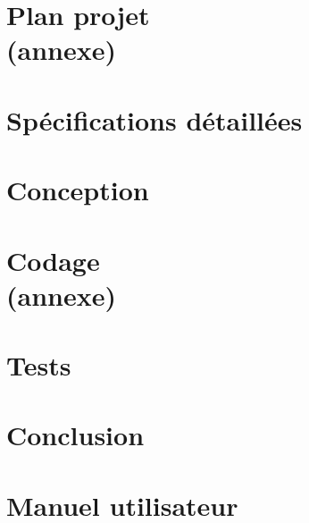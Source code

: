 \documentclass[12pt,a4paper,titlepage,oneside]{report}
\begin{document}
    \renewcommand{\contentsname}{Sommaire}
    \tableofcontents


    \normalsize
    \part{Plan projet\\(annexe)}
    \part{ Spécifications détaillées}
    
    \part{ Conception}
    \setcounter{chapter}{0}
    
    \part{Codage\\(annexe)}
    \part{Tests}
    

    \part{Conclusion}
    


    \appendix
    \part{Manuel utilisateur}
\end{document}
